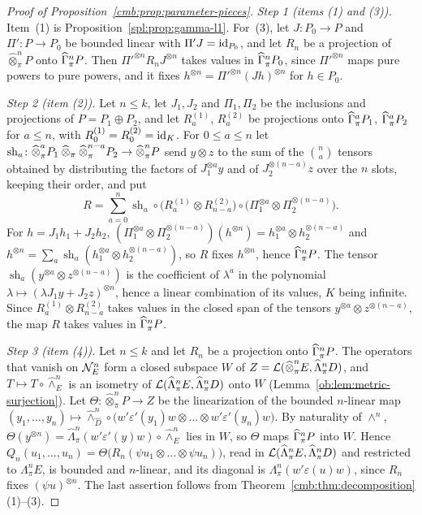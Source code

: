 \begin{proof}[Proof of Proposition~\ref{cmb:prop:parameter-pieces}]
\emph{Step 1 (items (1) and (3)).} Item~(1) is Proposition~\ref{spl:prop:gamma-l1}. For~(3), let $J\colon P_0\to P$ and
$\Pi'\colon P\to P_0$ be bounded linear with $\Pi'J=\mathrm{id}_{P_0}$, and let $R_n$ be a projection of $\widehat\otimes^n_\pi P$
onto $\widehat\Gamma^n_\pi P$. Then ${\Pi'}^{\otimes n}R_nJ^{\otimes n}$ takes values in $\widehat\Gamma^n_\pi P_0$, since
${\Pi'}^{\otimes n}$ maps pure powers to pure powers, and it fixes $h^{\otimes n}={\Pi'}^{\otimes n}(Jh)^{\otimes n}$ for
$h\in P_0$.

\emph{Step 2 (item (2)).} Let $n\le k$, let $J_1,J_2$ and $\Pi_1,\Pi_2$ be the inclusions and projections of
$P=P_1\oplus P_2$, and let $R^{(1)}_a$, $R^{(2)}_a$ be projections onto $\widehat\Gamma^a_\pi P_1$, $\widehat\Gamma^a_\pi P_2$ for
$a\le n$, with $R^{(1)}_0=R^{(2)}_0=\mathrm{id}_K$. For $0\le a\le n$ let
$\operatorname{sh}_a\colon\widehat\otimes^a_\pi P_1\mathbin{\widehat\otimes}_\pi\widehat\otimes^{n-a}_\pi P_2\to\widehat\otimes^n_\pi P$ send
$y\otimes z$ to the sum of the $\binom na$ tensors obtained by distributing the factors of $J_1^{\otimes a}y$ and of
$J_2^{\otimes(n-a)}z$ over the $n$ slots, keeping their order, and put
\[
 R=\sum_{a=0}^n\operatorname{sh}_a\circ\bigl(R^{(1)}_a\otimes R^{(2)}_{n-a}\bigr)\circ
 \bigl(\Pi_1^{\otimes a}\otimes\Pi_2^{\otimes(n-a)}\bigr).
\]
For $h=J_1h_1+J_2h_2$, $(\Pi_1^{\otimes a}\otimes\Pi_2^{\otimes(n-a)})(h^{\otimes n})=h_1^{\otimes a}\otimes
h_2^{\otimes(n-a)}$ and $h^{\otimes n}=\sum_a\operatorname{sh}_a(h_1^{\otimes a}\otimes h_2^{\otimes(n-a)})$, so $R$ fixes
$h^{\otimes n}$, hence $\widehat\Gamma^n_\pi P$. The tensor $\operatorname{sh}_a(y^{\otimes a}\otimes z^{\otimes(n-a)})$ is the
coefficient of $\lambda^a$ in the polynomial $\lambda\mapsto(\lambda J_1y+J_2z)^{\otimes n}$, hence a linear combination of
its values, $K$ being infinite. Since $R^{(1)}_a\otimes R^{(2)}_{n-a}$ takes values in the closed span of the tensors
$y^{\otimes a}\otimes z^{\otimes(n-a)}$, the map $R$ takes values in $\widehat\Gamma^n_\pi P$.

\emph{Step 3 (item (4)).} Let $n\le k$ and let $R_n$ be a projection onto $\widehat\Gamma^n_\pi P$. The operators that vanish on
$\mathcal N^n_E$ form a closed subspace $W$ of $Z=\mathcal L(\widehat\otimes^n_\pi E,\widehat\Lambda^n_\pi D)$, and
$T\mapsto T\circ\widehat\wedge^n_E$ is an isometry of $\mathcal L(\widehat\Lambda^n_\pi E,\widehat\Lambda^n_\pi D)$ onto $W$
(Lemma~\ref{ob:lem:metric-surjection}). Let $\Theta\colon\widehat\otimes^n_\pi P\to Z$ be the linearization of the bounded
$n$-linear map
$(y_1,\dots,y_n)\mapsto\widehat\wedge^n_{\widehat D}\circ\bigl(w'\varepsilon'(y_1)w\otimes\dots\otimes w'\varepsilon'(y_n)w\bigr)$.
By naturality of $\wedge^n$, $\Theta(y^{\otimes n})=\widehat\Lambda^n_\pi(w'\varepsilon'(y)w)\circ\widehat\wedge^n_E$ lies in
$W$, so $\Theta$ maps $\widehat\Gamma^n_\pi P$ into $W$. Hence
$Q_n(u_1,\dots,u_n)=\Theta\bigl(R_n(\psi u_1\otimes\dots\otimes\psi u_n)\bigr)$, read in
$\mathcal L(\widehat\Lambda^n_\pi E,\widehat\Lambda^n_\pi D)$ and restricted to $\Lambda^n_\pi E$, is bounded and $n$-linear, and
its diagonal is $\Lambda^n_\pi(w'\varepsilon(u)w)$, since $R_n$ fixes $(\psi u)^{\otimes n}$. The last assertion follows
from Theorem~\ref{cmb:thm:decomposition}(1)--(3).
\end{proof}

